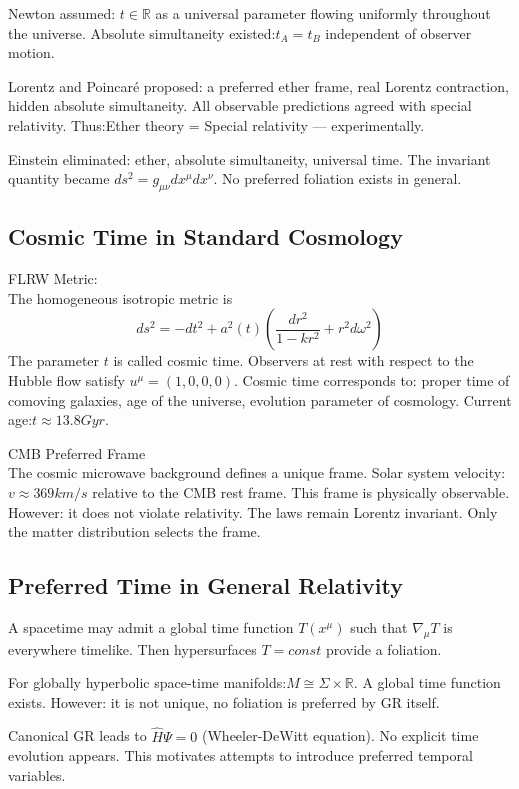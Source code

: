 Newton assumed: $t \in \mathbb{R}$
as a universal parameter flowing uniformly throughout the universe.
Absolute simultaneity existed:$t_A=t_B$
independent of observer motion.

Lorentz and Poincaré proposed:
a preferred ether frame,
real Lorentz contraction,
hidden absolute simultaneity.
All observable predictions agreed with special relativity.
Thus:Ether theory = Special relativity ---
experimentally.

Einstein eliminated:
ether,
absolute simultaneity,
universal time.
The invariant quantity became $ds^2= g_{\mu \nu} dx^\mu dx^\nu$.
No preferred foliation exists in general.

 \subsection{Cosmic Time in Standard Cosmology}
FLRW Metric:\\
The homogeneous isotropic metric is
\begin{equation}
   \label {crt:cpt-flrw}
    ds^2=-dt^2+a^2(t) (\frac{dr^2}{1-k r^2}+r^2 d \omega^2)
\end{equation}
The parameter $ t $ is called cosmic time.
Observers at rest with respect to the Hubble flow satisfy
$ u^\mu=(1,0,0,0).$
Cosmic time corresponds to:
proper time of comoving galaxies,
age of the universe,
evolution parameter of cosmology.
Current age:$ t \approx 13.8 Gyr. $

CMB Preferred Frame\\
The cosmic microwave background defines a unique frame.
Solar system velocity:$ v \approx 369 km/s $
relative to the CMB rest frame.
This frame is physically observable.
However:
it does not violate relativity.
The laws remain Lorentz invariant.
Only the matter distribution selects the frame.

\subsection{Preferred Time in General Relativity}
A spacetime may admit a global time function $ T(x^\mu) $
such that $ \nabla_ \mu T $ is everywhere timelike.
Then hypersurfaces $ T=const $ provide a foliation.

For globally hyperbolic space-time manifolds:$ M\cong \Sigma \times \mathbb{R}.$ A global time function exists.
However:
it is not unique,
no foliation is preferred by GR itself.

Canonical GR leads to $ \hat H \Psi=0 $ (Wheeler-DeWitt equation).
No explicit time evolution appears.
This motivates attempts to introduce preferred temporal variables.

